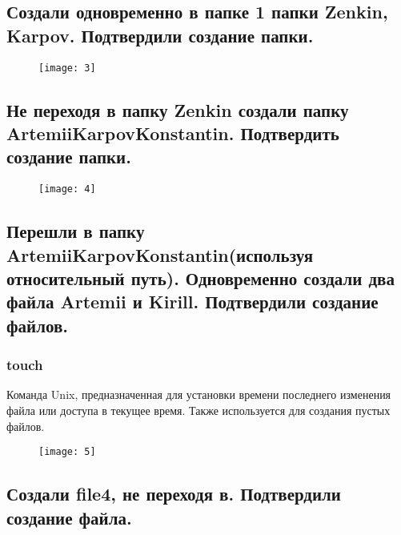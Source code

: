 \subsection{Создали одновременно в папке 1 папки Zenkin, Karpov. Подтвердили создание папки.}

\begin{figure}[H]
	\begin{center}
		\texttt{[image: 3]}
		\caption{} 
		\label{pic:pic_6} %
	\end{center}
\end{figure}

\subsection{Не переходя в папку Zenkin создали папку ArtemiiKarpovKonstantin.  Подтвердить создание папки. }

\begin{figure}[H]
	\begin{center}
		\texttt{[image: 4]}
		\caption{} 
		\label{pic:pic_7} %
	\end{center}
\end{figure}

\subsection{Перешли в папку ArtemiiKarpovKonstantin(используя относительный путь). Одновременно создали два файла Artemii и Kirill. Подтвердили создание файлов.}

\subsubsection{touch}
Команда Unix, предназначенная для установки времени последнего изменения файла или доступа в текущее время. Также используется для создания пустых файлов.

\begin{figure}[H]
	\begin{center}
		\texttt{[image: 5]}
		\caption{} 
		\label{pic:pic_8} %
	\end{center}
\end{figure}

\newpage

\subsection{Создали file4, не переходя в. Подтвердили создание файла.}

